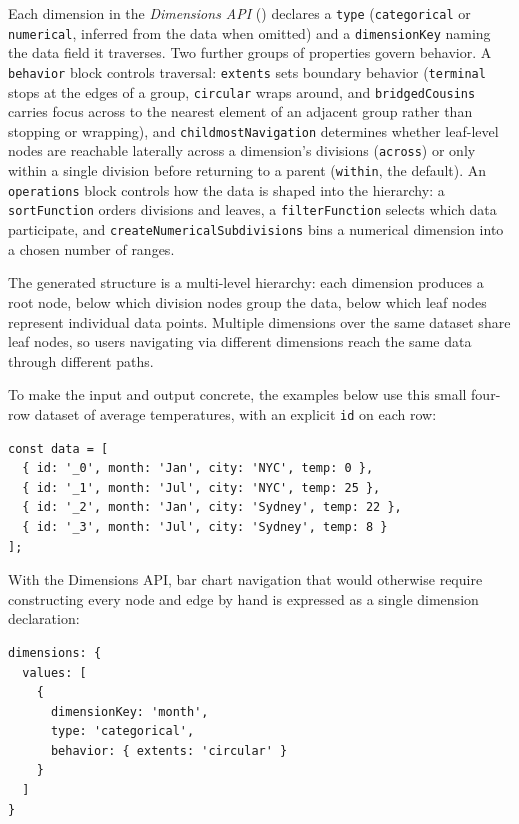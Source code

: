 \documentclass[12pt]{cmuthesis}
\begin{document}
Each dimension in the \textit{Dimensions API} () declares a \texttt{type} (\texttt{categorical} or \texttt{numerical}, inferred from the data when omitted) and a \texttt{dimensionKey} naming the data field it traverses. Two further groups of properties govern behavior. A \texttt{behavior} block controls traversal: \texttt{extents} sets boundary behavior (\texttt{terminal} stops at the edges of a group, \texttt{circular} wraps around, and \texttt{bridgedCousins} carries focus across to the nearest element of an adjacent group rather than stopping or wrapping), and \texttt{childmostNavigation} determines whether leaf-level nodes are reachable laterally across a dimension's divisions (\texttt{across}) or only within a single division before returning to a parent (\texttt{within}, the default). An \texttt{operations} block controls how the data is shaped into the hierarchy: a \texttt{sortFunction} orders divisions and leaves, a \texttt{filterFunction} selects which data participate, and \texttt{createNumericalSubdivisions} bins a numerical dimension into a chosen number of ranges.

The generated structure is a multi-level hierarchy: each dimension produces a root node, below which division nodes group the data, below which leaf nodes represent individual data points. Multiple dimensions over the same dataset share leaf nodes, so users navigating via different dimensions reach the same data through different paths.

To make the input and output concrete, the examples below use this small four-row dataset of average temperatures, with an explicit \texttt{id} on each row:

\begin{verbatim}
const data = [
  { id: '_0', month: 'Jan', city: 'NYC', temp: 0 },
  { id: '_1', month: 'Jul', city: 'NYC', temp: 25 },
  { id: '_2', month: 'Jan', city: 'Sydney', temp: 22 },
  { id: '_3', month: 'Jul', city: 'Sydney', temp: 8 }
];
\end{verbatim}

\noindent With the Dimensions API, bar chart navigation that would otherwise require constructing every node and edge by hand is expressed as a single dimension declaration:

\begin{verbatim}
dimensions: {
  values: [
    { 
      dimensionKey: 'month',
      type: 'categorical',
      behavior: { extents: 'circular' }
    }
  ]
}
\end{verbatim}
\end{document}
